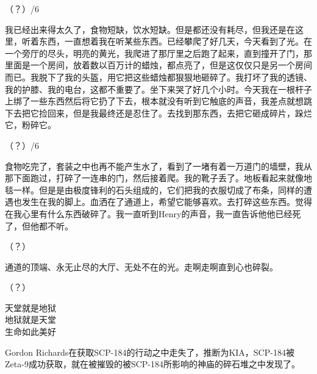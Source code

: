 \hr

（？）\slash 6

我已经出来得太久了，食物短缺，饮水短缺。但是都还没有耗尽，但我还是在这里，听着东西，一直想着我在听某些东西。已经攀爬了好几天，今天看到了光。在一个旁厅的尽头，明亮的黄光，我爬进了那厅里之后跑了起来，直到撞开了门，那里面是一个房间，放着数以百万计的蜡烛，都点亮了，但是这仅仅只是另一个房间而已。我脱下了我的头盔，用它把这些蜡烛都狠狠地砸碎了。我打坏了我的透镜、我的护膝、我的电台，这都不重要了。坐下来哭了好几个小时。今天我在一根杆子上绑了一些东西然后将它扔了下去，根本就没有听到它触底的声音，我差点就想跳下去把它捡回来，但是我最终还是忍住了。去找到那东西，去把它砸成碎片，跺烂它，粉碎它。

\hr

（？）\slash 6

食物吃完了，套装之中也再不能产生水了，看到了一堵有着一万道门的墙壁，我从那下面跑过，打碎了一连串的门，然后接着爬。我的靴子丢了。地板看起来就像地毯一样。但是是由极度锋利的石头组成的，它们把我的衣服切成了布条，同样的遭遇也发生在我的脚上。血洒在了通道上，希望它能够喜欢。去打碎这些东西。觉得在我心里有什么东西破碎了。我一直听到Henry的声音，我一直告诉他他已经死了，但他都不听。

\hr

（？）

通道的顶端、永无止尽的大厅、无处不在的光。走啊走啊直到心也碎裂。

\hr

（？）

天堂就是地狱\\
地狱就是天堂\\
生命如此美好

\hr

Gordon Richards在获取SCP-184的行动之中走失了，推断为KIA，SCP-184被Zeta-9成功获取，就在被摧毁的被SCP-184所影响的神庙的碎石堆之中发现了。
